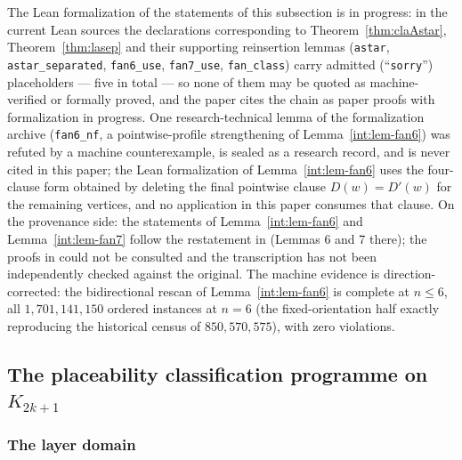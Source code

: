 \begin{remark}
\label{rem:claformal}
The Lean formalization of the statements of this subsection is in
progress: in the current Lean sources the declarations corresponding to
Theorem~\ref{thm:claAstar}, Theorem~\ref{thm:lasep} and their supporting
reinsertion lemmas (\texttt{astar}, \texttt{astar\_separated},
\texttt{fan6\_use}, \texttt{fan7\_use}, \texttt{fan\_class}) carry
admitted (``\texttt{sorry}'') placeholders --- five in total --- so none
of them may be quoted as machine-verified or formally proved, and the
paper cites the chain as paper proofs with formalization in progress.
One research-technical lemma of the formalization archive
(\texttt{fan6\_nf}, a pointwise-profile strengthening of
Lemma~\ref{int:lem-fan6}) was refuted by a machine counterexample, is sealed
as a research record, and is never cited in this paper; the Lean
formalization of Lemma~\ref{int:lem-fan6} uses the four-clause form obtained
by deleting the final pointwise clause $D(w)=D'(w)$ for the remaining
vertices, and no application in this paper consumes that clause. On the
provenance side: the statements of Lemma~\ref{int:lem-fan6} and
Lemma~\ref{int:lem-fan7} follow the restatement in \cite{BS21} (Lemmas 6 and
7 there); the proofs in \cite{Fan05} could not be consulted and the
transcription has not been independently checked against the original.
The machine evidence is direction-corrected: the bidirectional rescan of
Lemma~\ref{int:lem-fan6} is complete at $n\le6$, all
$1{,}701{,}141{,}150$ ordered instances at $n=6$ (the fixed-orientation
half exactly reproducing the historical census of $850{,}570{,}575$), with
zero violations.
\end{remark}

\subsection{The placeability classification programme on
\texorpdfstring{$K_{2k+1}$}{K(2k+1)}}\label{subsec:echar}

\subsubsection{The layer domain}\label{subsubsec:layerdomain}

